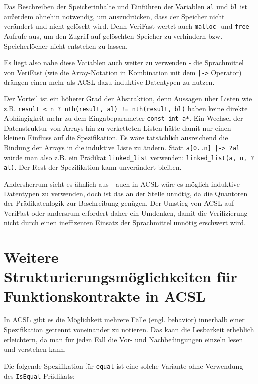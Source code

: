 Das Beschreiben der Speicherinhalte und Einführen der Variablen  \lstinline{al} und \lstinline{bl} ist außerdem
ohnehin notwendig, um auszudrücken, dass der Speicher nicht verändert und nicht gelöscht wird. Denn VeriFast wertet
auch \lstinline{malloc}- und \lstinline{free}-Aufrufe aus, um den Zugriff auf gelöschten Speicher zu verhindern bzw.
Speicherlöcher nicht entstehen zu lassen.

Es liegt also nahe diese Variablen auch weiter zu verwenden - die Sprachmittel von VeriFast (wie die Array-Notation in Kombination mit dem
\lstinline{|->} Operator) drängen einen mehr als ACSL dazu induktive Datentypen zu nutzen.

Der Vorteil ist ein höherer Grad der Abstraktion, denn Aussagen über Listen wie z.B.
\lstinline{result < n ? nth(result, al) != nth(result, bl)} haben keine direkte Abhängigkeit mehr zu
dem Eingabeparameter \lstinline{const int a*}. Ein Wechsel der Datenstruktur von Arrays
hin zu verketteten Listen hätte damit nur einen kleinen Einfluss auf die Spezifikation. Es wäre tatsächlich 
ausreichend die Bindung der Arrays in die induktive Liste zu ändern. Statt \lstinline{a[0..n] |-> ?al} würde man also
z.B. ein Prädikat \lstinline{linked_list} verwenden: \lstinline{linked_list(a, n, ?al)}. Der Rest der 
Spezifikation kann unverändert bleiben.

Andersherrum sieht es ähnlich aus - auch in ACSL wäre es möglich induktive Datentypen zu verwenden, doch
ist das an der Stelle unnötig, da die Quantoren der Prädikatenlogik zur Beschreibung genügen. 
Der Umstieg von ACSL auf VeriFast oder andersrum erfordert daher ein Umdenken, damit die Verifizierung 
nicht durch einen ineffizenten Einsatz der Sprachmittel unnötig erschwert wird.



\section{Weitere Strukturierungsmöglichkeiten für Funktionskontrakte in ACSL}
\label{sec:design-by-contract:behaviors}

In ACSL gibt es die Möglichkeit mehrere Fälle (engl. behavior) innerhalb einer Spezifikation getrennt voneinander zu
notieren. Das kann die Lesbarkeit erheblich erleichtern, da man für jeden Fall die Vor- und Nachbedingungen
einzeln lesen und verstehen kann.

Die folgende Spezifikation für \texttt{equal} ist eine solche Variante ohne Verwendung des 
\lstinline{IsEqual}-Prädikats:

